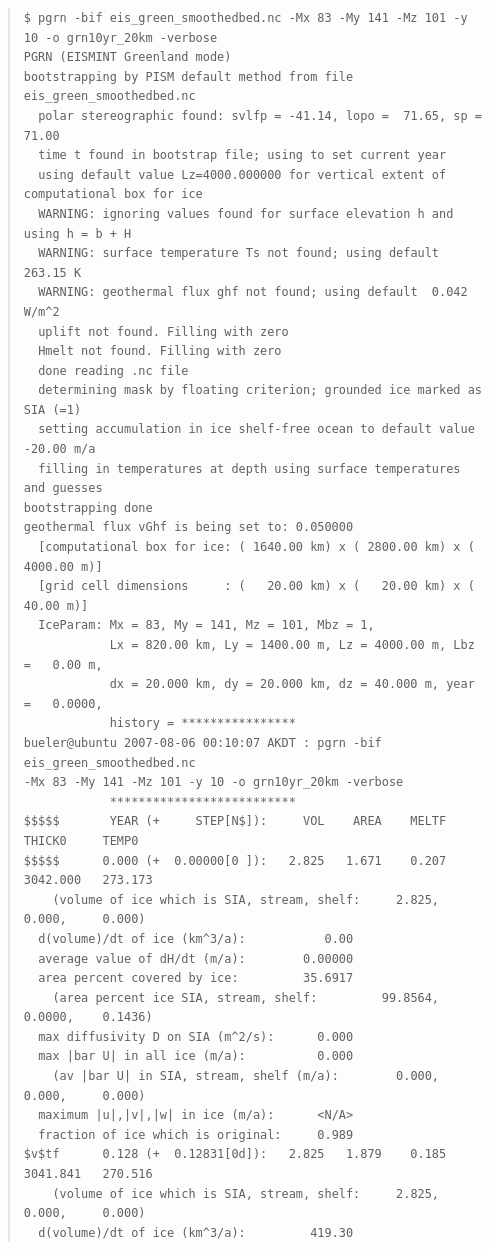 \documentclass[11pt,final]{amsart}
\begin{document}
\small\begin{quote}\begin{verbatim}
$ pgrn -bif eis_green_smoothedbed.nc -Mx 83 -My 141 -Mz 101 -y 10 -o grn10yr_20km -verbose
PGRN (EISMINT Greenland mode)
bootstrapping by PISM default method from file eis_green_smoothedbed.nc
  polar stereographic found: svlfp = -41.14, lopo =  71.65, sp =  71.00
  time t found in bootstrap file; using to set current year
  using default value Lz=4000.000000 for vertical extent of computational box for ice
  WARNING: ignoring values found for surface elevation h and using h = b + H
  WARNING: surface temperature Ts not found; using default  263.15 K
  WARNING: geothermal flux ghf not found; using default  0.042 W/m^2
  uplift not found. Filling with zero
  Hmelt not found. Filling with zero
  done reading .nc file
  determining mask by floating criterion; grounded ice marked as SIA (=1)
  setting accumulation in ice shelf-free ocean to default value -20.00 m/a
  filling in temperatures at depth using surface temperatures and guesses
bootstrapping done
geothermal flux vGhf is being set to: 0.050000
  [computational box for ice: ( 1640.00 km) x ( 2800.00 km) x ( 4000.00 m)]
  [grid cell dimensions     : (   20.00 km) x (   20.00 km) x (   40.00 m)]
  IceParam: Mx = 83, My = 141, Mz = 101, Mbz = 1,
            Lx = 820.00 km, Ly = 1400.00 m, Lz = 4000.00 m, Lbz =   0.00 m,
            dx = 20.000 km, dy = 20.000 km, dz = 40.000 m, year =   0.0000,
            history = ****************
bueler@ubuntu 2007-08-06 00:10:07 AKDT : pgrn -bif eis_green_smoothedbed.nc 
-Mx 83 -My 141 -Mz 101 -y 10 -o grn10yr_20km -verbose
            **************************
$$$$$       YEAR (+     STEP[N$]):     VOL    AREA    MELTF     THICK0     TEMP0
$$$$$      0.000 (+  0.00000[0 ]):   2.825   1.671    0.207   3042.000   273.173
    (volume of ice which is SIA, stream, shelf:     2.825,     0.000,     0.000)
  d(volume)/dt of ice (km^3/a):           0.00
  average value of dH/dt (m/a):        0.00000
  area percent covered by ice:         35.6917
    (area percent ice SIA, stream, shelf:         99.8564,    0.0000,    0.1436)
  max diffusivity D on SIA (m^2/s):      0.000
  max |bar U| in all ice (m/a):          0.000
    (av |bar U| in SIA, stream, shelf (m/a):        0.000,     0.000,     0.000)
  maximum |u|,|v|,|w| in ice (m/a):      <N/A>
  fraction of ice which is original:     0.989
$v$tf      0.128 (+  0.12831[0d]):   2.825   1.879    0.185   3041.841   270.516
    (volume of ice which is SIA, stream, shelf:     2.825,     0.000,     0.000)
  d(volume)/dt of ice (km^3/a):         419.30

\end{verbatim}
\end{quote}
\end{document}
